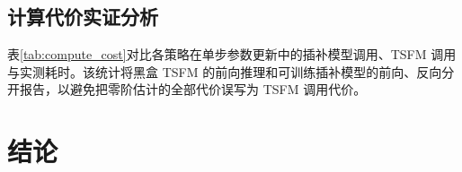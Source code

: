 \documentclass{article}
\begin{document}
\subsection{计算代价实证分析}

表\ref{tab:compute_cost}对比各策略在单步参数更新中的插补模型调用、TSFM 调用与实测耗时。该统计将黑盒 TSFM 的前向推理和可训练插补模型的前向、反向分开报告，以避免把零阶估计的全部代价误写为 TSFM 调用代价。

\begin{table}[htbp]
\centering
\caption{单步参数更新的计算代价对比}
\label{tab:compute_cost}
\footnotesize
{}
\end{table}

\FloatBarrier
\newpage

\section{结论}



\newpage


\end{document}
